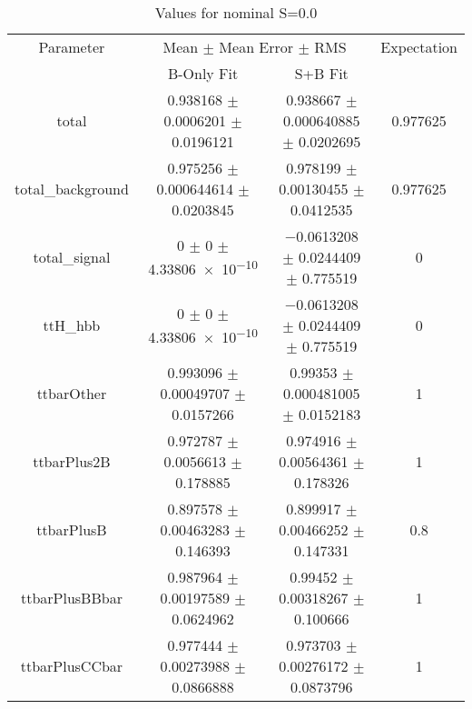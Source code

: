 \begin{table}
\centering
\caption{Values for nominal S=0.0}
\begin{tabular}{cccc}
\toprule
Parameter & \multicolumn{2}{c}{Mean $\pm$ Mean Error $\pm$ RMS} & Expectation\\
 & B-Only Fit & S+B Fit & \\
\midrule
total & \num{0.938168} $\pm$ \num{0.0006201} $\pm$ \num{0.0196121} & \num{0.938667} $\pm$ \num{0.000640885} $\pm$ \num{0.0202695} & \num{0.977625}\\
total\_background & \num{0.975256} $\pm$ \num{0.000644614} $\pm$ \num{0.0203845} & \num{0.978199} $\pm$ \num{0.00130455} $\pm$ \num{0.0412535} & \num{0.977625}\\
total\_signal & \num{0} $\pm$ \num{0} $\pm$ \num{4.33806e-10} & \num{-0.0613208} $\pm$ \num{0.0244409} $\pm$ \num{0.775519} & \num{0}\\
ttH\_hbb & \num{0} $\pm$ \num{0} $\pm$ \num{4.33806e-10} & \num{-0.0613208} $\pm$ \num{0.0244409} $\pm$ \num{0.775519} & \num{0}\\
ttbarOther & \num{0.993096} $\pm$ \num{0.00049707} $\pm$ \num{0.0157266} & \num{0.99353} $\pm$ \num{0.000481005} $\pm$ \num{0.0152183} & \num{1}\\
ttbarPlus2B & \num{0.972787} $\pm$ \num{0.0056613} $\pm$ \num{0.178885} & \num{0.974916} $\pm$ \num{0.00564361} $\pm$ \num{0.178326} & \num{1}\\
ttbarPlusB & \num{0.897578} $\pm$ \num{0.00463283} $\pm$ \num{0.146393} & \num{0.899917} $\pm$ \num{0.00466252} $\pm$ \num{0.147331} & \num{0.8}\\
ttbarPlusBBbar & \num{0.987964} $\pm$ \num{0.00197589} $\pm$ \num{0.0624962} & \num{0.99452} $\pm$ \num{0.00318267} $\pm$ \num{0.100666} & \num{1}\\
ttbarPlusCCbar & \num{0.977444} $\pm$ \num{0.00273988} $\pm$ \num{0.0866888} & \num{0.973703} $\pm$ \num{0.00276172} $\pm$ \num{0.0873796} & \num{1}\\
\bottomrule
\end{tabular}
\end{table}
